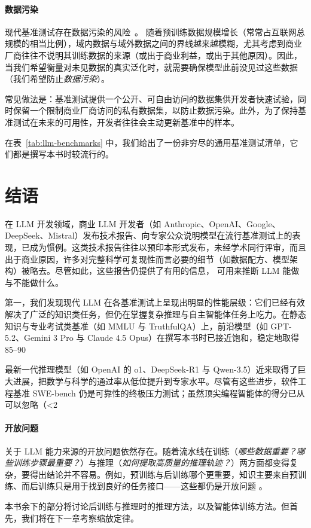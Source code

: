\paragraph{数据污染}
现代基准测试存在数据污染的风险~\citep{balloccu-etal-2024-leak}。
随着预训练数据规模增长（常常占互联网总规模的相当比例），域内数据与域外数据之间的界线越来越模糊，尤其考虑到商业厂商往往不说明其训练数据的来源（或出于商业利益，或出于其他原因）。因此，当我们希望衡量对未见数据的真实泛化时，就需要确保模型此前没见过这些数据（我们希望防止{\em 数据污染}）。

常见做法是：基准测试提供一个公开、可自由访问的数据集供开发者快速试验，同时保留一个限制商业厂商访问的私有数据集，以防止数据污染。此外，为了保持基准测试在未来的可用性，开发者往往会主动更新基准中的样本。

在表~\ref{tab:llm-benchmarks} 中，我们给出了一份非穷尽的通用基准测试清单，它们都是撰写本书时较流行的。

\section{结语}

在 LLM 开发领域，商业 LLM 开发者（如 Anthropic、OpenAI、Google、DeepSeek、Mistral）发布技术报告、向专家公众说明模型在流行基准测试上的表现，已成为惯例。这类技术报告往往以预印本形式发布，未经学术同行评审，而且出于商业原因，许多对完整科学可复现性而言必要的细节（如数据配方、模型架构）被略去。尽管如此，这些报告仍提供了有用的信息，%
可用来推断 LLM 能做与不能做什么。

第一，我们发现现代 LLM 在各基准测试上呈现出明显的性能层级：它们已经有效解决了广泛的知识类任务，但仍在掌握复杂推理与自主智能体任务上吃力。在静态知识与专业考试类基准（如 MMLU 与 TruthfulQA）上，前沿模型（如 GPT-5.2、Gemini 3 Pro 与 Claude 4.5 Opus）在撰写本书时已接近饱和，稳定地取得 85–90%

最新一代推理模型（如 OpenAI 的 o1、DeepSeek-R1 与 Qwen-3.5）近来取得了巨大进展，把数学与科学的通过率从低位提升到专家水平。尽管有这些进步，软件工程基准 SWE-bench 仍是可靠性的终极压力测试；虽然顶尖编程智能体的得分已从可以忽略（<2%

\paragraph{开放问题}
关于 LLM 能力来源的开放问题依然存在。随着流水线在训练（{\em 哪些数据重要？哪些训练步骤最重要？}）与推理（{\em 如何提取高质量的推理轨迹？}）两方面都变得复杂，要得出结论并不容易。例如，预训练与后训练哪个更重要，知识主要来自预训练、而后训练只是用于找到良好的任务接口——这些都仍是开放问题 \citep{zhou2023lima}。

本书余下的部分将讨论后训练与推理时的推理方法，以及智能体训练方法。但首先，我们将在下一章考察缩放定律。 




